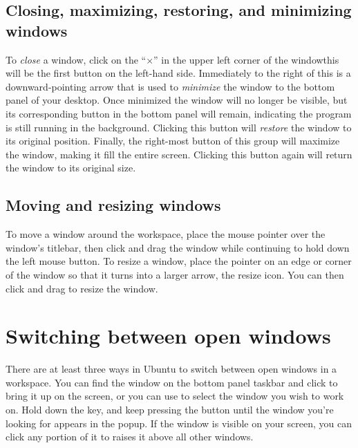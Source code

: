 \subsection{Closing, maximizing, restoring, and minimizing windows}


\noindent To \emph{close} a window, click on the ``$\times$'' in the upper left corner of the window\dash this will be the first button on the left-hand side. Immediately to the right of this is a downward-pointing arrow that is used to \emph{minimize} the window to the bottom panel of your desktop. Once minimized the window will no longer be visible, but its corresponding button in the bottom panel will remain, indicating the program is still running in the background. Clicking this button will \emph{restore} the window to its original position. Finally, the right-most button of this group will \gls{maximize} the window, making it fill the entire screen. Clicking this button again will return the window to its original size.

\subsection{Moving and resizing windows}
To move a window around the workspace, place the mouse pointer over the window's titlebar, then click
and drag the window while continuing to hold down the left mouse button.  To resize a window, place the pointer on an edge or corner of the window 
so that it turns into a larger arrow, the resize icon. You can then click and drag to resize the window.

\section{Switching between open windows}

There are at least three ways in Ubuntu to switch between open windows in a workspace.  You can 
find the window on the bottom panel taskbar and click to bring it up on the screen, or you 
can use  to select the window you wish to work on. Hold down the 
 key, and keep pressing the  button until the window you're 
looking for appears in the popup. If the window is visible on your screen, you can click any 
portion of it to raises it above all other windows.

